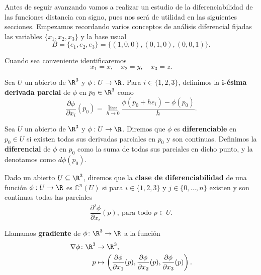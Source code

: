 Antes de seguir avanzando vamos a realizar un estudio de la diferenciabilidad de las funciones distancia con signo, pues nos será de utilidad en las siguientes secciones. Empezamos recordando varios conceptos de análisis diferencial \cite{diff} fijadas las variables $\{x_1,x_2,x_3\}$ y la base usual $$B=\{e_1,e_2,e_3\} = \{(1,0,0),(0,1,0),(0,0,1)\}.$$

Cuando sea conveniente identificaremos
\begin{equation*}
    x_1=x,\quad x_2=y,\quad x_3 = z.
\end{equation*}

\begin{definicion}\label{def:parcial}
    Sea $U$ un abierto de $\R^3$ y $\phi: U \to \R$. Para $i\in \{1,2,3\}$, definimos la \textbf{$\boldsymbol{i}$-ésima derivada parcial} de $\phi$ en $p_0\in\R^3$ como
    \begin{equation*}
        \frac{\partial \phi}{\partial x_i}(p_0) = \lim_{h\to 0}\frac{\phi(p_0+he_i) - \phi(p_0)}{h}.
    \end{equation*}
\end{definicion}

\begin{definicion}
    Sea $U$ un abierto de $\R^3$ y $\phi: U \to \R$. Diremos que $\phi$ es \textbf{diferenciable} en $p_0 \in U$ si existen todas sus derivadas parciales en $p_0$ y son continuas. Definimos la \textbf{diferencial} de $\phi$ en $p_0$ como la suma de todas sus parciales en dicho punto, y la denotamos como $d\phi(p_0)$.

\end{definicion}

\begin{definicion}
    Dado un abierto $U\subseteq \R^3$, diremos que la \textbf{clase de diferenciabilidad} de una función $\phi:U\to \R$ es $\mathbb{C}^n(U)$ si para $i\in \{1,2,3\}$ y $j\in \{0,\dots, n\}$ existen y son continuas todas las parciales
    \begin{equation*}
        \frac{\partial^j \phi}{\partial x_i}(p),\ \text{para todo } p\in U.
    \end{equation*}
\end{definicion}

\begin{definicion}
  Llamamos \textbf{gradiente} de $\phi\colon \R^3\to\R$ a la función
  \begin{align*}
      \nabla\phi\colon \R^3 &\to \R^3,\\
      p &\mapsto \left(\frac{\partial \phi}{\partial x_1}(p), \frac{\partial \phi}{\partial x_2}(p), \frac{\partial \phi}{\partial x_3}(p)\right).
  \end{align*}
\end{definicion}

